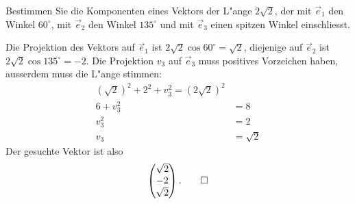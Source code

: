 Bestimmen Sie die Komponenten eines Vektors der L"ange $2\sqrt{2}$,
der mit $\vec e_1$ den Winkel $60^\circ$, mit $\vec e_2$ den Winkel
$135^\circ$ und mit $\vec e_3$ einen spitzen Winkel einschliesst.

\begin{loesung}
Die Projektion des Vektors auf $\vec e_1$ ist $2\sqrt{2}\cos 60^\circ=\sqrt{2}$,
diejenige auf $\vec e_2$ ist $2\sqrt{2}\cos135^\circ=-2$. Die Projektion $v_3$
auf $\vec e_3$ muss positives Vorzeichen haben, ausserdem muss die
L"ange stimmen:
\begin{align*}
(\sqrt{2})^2+2^2+v_3^2=(2\sqrt{2})^2\\
6+v_3^2&=8\\
v_3^2&=2\\
v_3&=\sqrt {2}
\end{align*}
Der gesuchte Vektor ist also
\[
\begin{pmatrix}\sqrt{2}\\-2\\\sqrt{2}\end{pmatrix}.
\qedhere
\]
\end{loesung}

